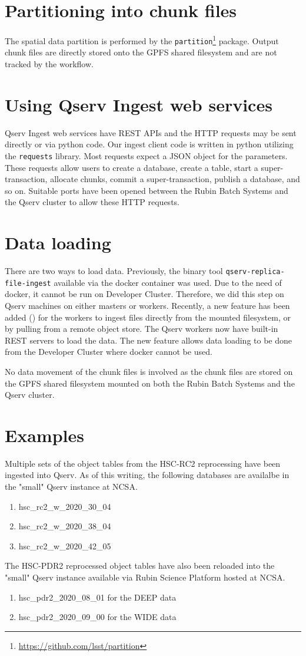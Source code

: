 \section{Partitioning into chunk files}
The spatial data partition is performed by the \texttt{partition}\footnote{\url{https://github.com/lsst/partition}} package.
Output chunk files are directly stored onto the GPFS shared filesystem and are not tracked by the workflow.


\section{Using Qserv Ingest web services}
Qserv Ingest web services have REST APIs and the HTTP requests may be sent directly or via python code.
Our ingest client code is written in python utilizing the \texttt{requests} library.
Most requests expect a JSON object for the parameters.
These requests allow users to create a database, create a table, start a super-transaction, allocate chunks, commit a super-transaction, publish a database, and so on.
Suitable ports have been opened between the Rubin Batch Systems and the Qserv cluster to allow these HTTP requests.


\section{Data loading}
There are two ways to load data.
Previously, the binary tool \texttt{qserv-replica-file-ingest} available via the docker container was used. Due to the need of docker, it cannot be run on Developer Cluster. Therefore, we did this step on Qserv machines on either masters or workers.
Recently, a new feature has been added () for the workers to ingest files directly from the mounted filesystem, or by pulling from a remote object store. The Qserv workers now have built-in REST servers to load the data.  The new feature allows data loading to be done from the Developer Cluster where docker cannot be used.

No data movement of the chunk files is involved as the chunk files are stored on the GPFS shared filesystem mounted on both the Rubin Batch Systems and the Qserv cluster.

\section{Examples}
Multiple sets of the object tables from the HSC-RC2 reprocessing have been ingested into Qserv. As of this writing, the following databases are availalbe in the "small" Qserv instance at NCSA.
\begin{enumerate}
\item hsc\_rc2\_w\_2020\_30\_04
\item hsc\_rc2\_w\_2020\_38\_04
\item hsc\_rc2\_w\_2020\_42\_05
\end{enumerate}

The HSC-PDR2 reprocessed object tables have also been reloaded into the "small" Qserv instance available via Rubin Science Platform hosted at NCSA.
\begin{enumerate}
\item hsc\_pdr2\_2020\_08\_01 for the DEEP data
\item hsc\_pdr2\_2020\_09\_00 for the WIDE data
\end{enumerate}
